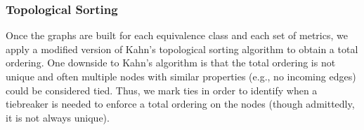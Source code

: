 \subsubsection{Topological Sorting}
Once the graphs are built for each equivalence class and each set of metrics, we apply a modified version of Kahn's topological sorting algorithm to obtain a total ordering. 
One downside to Kahn's algorithm is that the total ordering is not unique and often multiple nodes with similar properties (e.g., no incoming edges) could be considered tied. Thus, we mark ties in order to identify when a tiebreaker is needed to enforce a total ordering on the nodes (though admittedly, it is not always unique). 
